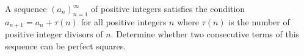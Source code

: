 A sequence $(a_n)_{n=1}^{\infty}$ of positive integers satisfies the condition $a_{n+1} = a_n +\tau (n)$ for all positive integers $n$ where $\tau (n)$ is the number of positive integer divisors of $n$. Determine whether two consecutive terms of this sequence can be perfect squares.